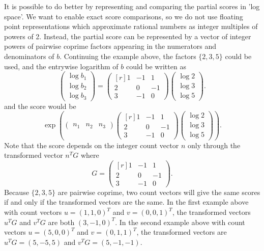\documentclass{article}
\begin{document}
It is possible to do better by representing and comparing the partial scores
in 'log space'.
We want to enable exact score comparisons,
so we do not use floating point representations which
approximate rational numbers as integer multiples of powers of 2.
Instead, the partial score can be represented by a vector
of integer powers of pairwise coprime factors appearing in the numerators
and denominators of $b$.
Continuing the example above, the factors $\{2, 3, 5\}$ could be used,
and the entrywise logarithm of $b$ could be written as
\begin{equation*}
\begin{pmatrix*}
\log{b_1} \\
\log{b_2} \\
\log{b_3}
\end{pmatrix*}
=
\begin{pmatrix*}[r]
1 & -1 & 1 \\
2 & 0 & -1 \\
3 & -1 & 0
\end{pmatrix*}
\begin{pmatrix*}
\log{2} \\
\log{3} \\
\log{5}
\end{pmatrix*}.
\end{equation*}
and the score would be
\begin{equation*}
\exp{\left(
\begin{pmatrix*}
n_1 & n_2 & n_3
\end{pmatrix*}
\begin{pmatrix*}[r]
1 & -1 & 1 \\
2 & 0 & -1 \\
3 & -1 & 0
\end{pmatrix*}
\begin{pmatrix*}
\log{2} \\
\log{3} \\
\log{5}
\end{pmatrix*}
\right)}.
\end{equation*}
%
Note that the score depends on the integer count vector $n$
only through the transformed vector $n^T G$ where
\begin{equation*}
G =
\begin{pmatrix*}[r]
1 & -1 & 1 \\
2 & 0 & -1 \\
3 & -1 & 0
\end{pmatrix*}.
\end{equation*}
%
Because $\{2, 3, 5\}$ are pairwise coprime,
two count vectors will give the same scores
if and only if the transformed vectors are the same.
In the first example above with count vectors
$u = (1, 1, 0)^T$ and $v = (0, 0, 1)^T$,
the transformed vectors $u^T G$ and $v^T G$ are both $(3, -1, 0)^T$.
In the second example above with count vectors
$u = (5, 0, 0)^T$ and $v = (0, 1, 1)^T$,
the transformed vectors are $u^T G = (5, -5, 5)$ and $v^T G = (5, -1, -1)$.
\end{document}
